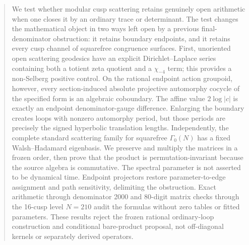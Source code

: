 \begin{abstract}
We test whether modular cusp scattering retains genuinely open arithmetic when
one closes it by an ordinary trace or determinant.  The test changes the
mathematical object in two ways left open by a previous final-denominator
obstruction: it retains boundary endpoints, and it retains every cusp channel
of squarefree congruence surfaces.  First, unoriented open scattering
geodesics have an explicit Dirichlet--Laplace series containing both a totient
zeta quotient and a \(\chi_{-4}\) term; this provides a non-Selberg positive
control.  On the rational endpoint action groupoid, however, every
section-induced absolute projective automorphy cocycle of the specified form
is an algebraic coboundary.  The affine value
\(2\log|c|\) is exactly an endpoint denominator-gauge difference.  Enlarging
the boundary creates loops with nonzero automorphy period, but those periods
are precisely the signed hyperbolic translation lengths.  Independently, the complete standard
scattering family for squarefree \(\Gamma_0(N)\) has a fixed
Walsh--Hadamard eigenbasis.  We preserve and multiply the matrices in a frozen
order, then prove that the product is permutation-invariant because the source
algebra is commutative.  The spectral parameter is not asserted to be
dynamical time.  Endpoint projectors restore parameter-to-edge assignment and
path sensitivity, delimiting the obstruction.  Exact arithmetic through
denominator 2000 and 80-digit matrix checks through the 16-cusp level
\(N=210\) audit the formulas without zero tables or fitted parameters.  These
results reject the frozen rational ordinary-loop construction and conditional
bare-product proposal, not off-diagonal kernels or separately derived
operators.
\end{abstract}
